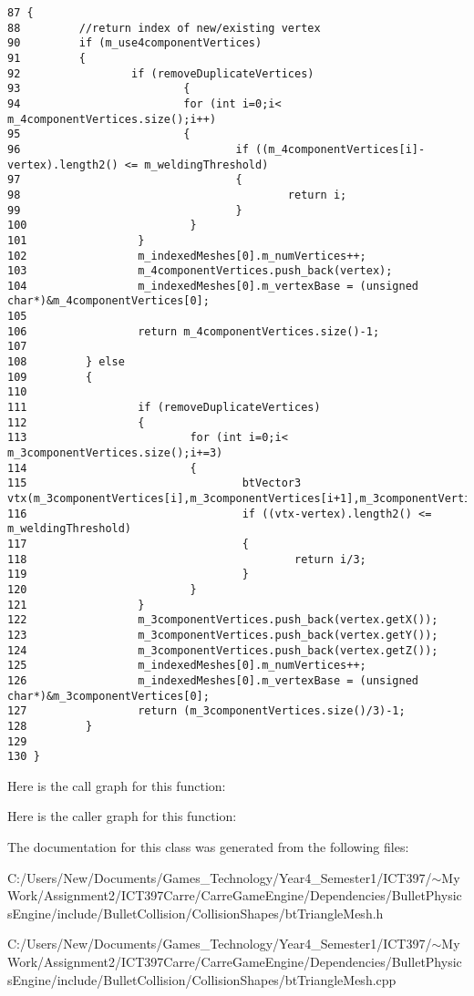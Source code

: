 \begin{Code}\begin{verbatim}87 {
88         //return index of new/existing vertex
90         if (m_use4componentVertices)
91         {
92                 if (removeDuplicateVertices)
93                         {
94                         for (int i=0;i< m_4componentVertices.size();i++)
95                         {
96                                 if ((m_4componentVertices[i]-vertex).length2() <= m_weldingThreshold)
97                                 {
98                                         return i;
99                                 }
100                         }
101                 }
102                 m_indexedMeshes[0].m_numVertices++;
103                 m_4componentVertices.push_back(vertex);
104                 m_indexedMeshes[0].m_vertexBase = (unsigned char*)&m_4componentVertices[0];
105 
106                 return m_4componentVertices.size()-1;
107                 
108         } else
109         {
110                 
111                 if (removeDuplicateVertices)
112                 {
113                         for (int i=0;i< m_3componentVertices.size();i+=3)
114                         {
115                                 btVector3 vtx(m_3componentVertices[i],m_3componentVertices[i+1],m_3componentVertices[i+2]);
116                                 if ((vtx-vertex).length2() <= m_weldingThreshold)
117                                 {
118                                         return i/3;
119                                 }
120                         }
121                 }
122                 m_3componentVertices.push_back(vertex.getX());
123                 m_3componentVertices.push_back(vertex.getY());
124                 m_3componentVertices.push_back(vertex.getZ());
125                 m_indexedMeshes[0].m_numVertices++;
126                 m_indexedMeshes[0].m_vertexBase = (unsigned char*)&m_3componentVertices[0];
127                 return (m_3componentVertices.size()/3)-1;
128         }
129 
130 }
\end{verbatim}
\end{Code}




Here is the call graph for this function:

Here is the caller graph for this function:

The documentation for this class was generated from the following files:\begin{CompactItemize}
\item 
C:/Users/New/Documents/Games\_\-Technology/Year4\_\-Semester1/ICT397/$\sim$My Work/Assignment2/ICT397Carre/CarreGameEngine/Dependencies/BulletPhysicsEngine/include/BulletCollision/CollisionShapes/btTriangleMesh.h\item 
C:/Users/New/Documents/Games\_\-Technology/Year4\_\-Semester1/ICT397/$\sim$My Work/Assignment2/ICT397Carre/CarreGameEngine/Dependencies/BulletPhysicsEngine/include/BulletCollision/CollisionShapes/btTriangleMesh.cpp\end{CompactItemize}
